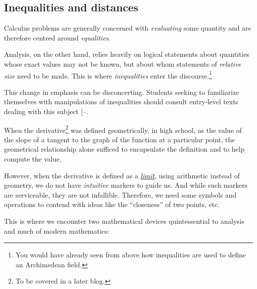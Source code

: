 \documentclass[
  a4paper,
]{article}
\begin{document}
\subsection{Inequalities and
distances}\label{inequalities-and-distances}

Calculus problems are generally concerned with \emph{evaluating} some
quantity and are therefore centred around \emph{equalities}.

Analysis, on the other hand, relies heavily on logical statements about
quantities whose exact values may not be known, but about whom
statements of \emph{relative size} need to be made. This is where
\emph{inequalities} enter the discourse.\footnote{You would have already
  seen from above how inequalities are used to define an Archimedean
  field.}

This change in emphasis can be disconcerting. Students seeking to
familiarize themselves with manipulations of inequalities should consult
entry-level texts dealing with this subject
{[}--\citeproc{ref-alsina-nelsen-2009}{3}{]}.

When the derivative\footnote{To be covered in a later blog.} was defined
geometrically, in high school, as the value of the slope of a tangent to
the graph of the function at a particular point, the geometrical
relationship alone sufficed to encapsulate the definition and to help
compute the value.

However, when the derivative is defined as a
\href{https://en.wikipedia.org/wiki/Limit_(mathematics)}{\emph{limit}},
using arithmetic instead of geometry, we do not have \emph{intuitive}
markers to guide us. And while such markers are serviceable, they are
not infallible. Therefore, we need some symbols and operations to
contend with ideas like the ``closeness'' of two points, etc.

This is where we encounter two mathematical devices quintessential to
analysis and much of modern mathematics:
\end{document}
